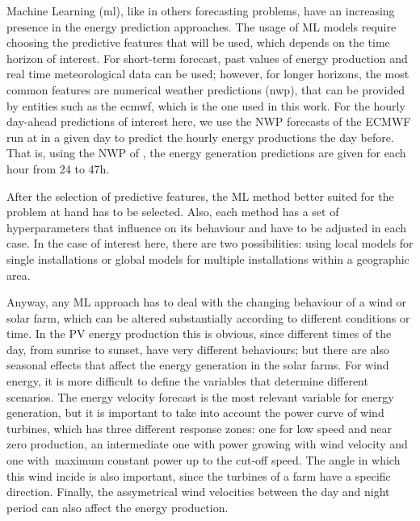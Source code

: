Machine Learning (\acrshort{ml}), like in others forecasting problems, have an increasing presence in the energy prediction approaches. 
The usage of ML models require choosing the predictive features that will be used, which depends on the time horizon of interest. 
For short-term forecast, past values of energy production and real time meteorological data can be used; however, for longer horizons, the most common features are numerical weather predictions (\acrshort{nwp}), that can be provided by entities such as the \acrlong{ecmwf}, which is the one used in this work.
For the hourly day-ahead predictions of interest here, we use the NWP forecasts of the ECMWF run at  in a given day to predict the hourly energy productions the day before. That is, using the NWP of , the energy generation predictions are given for each hour from {24} to {47}h.

After the selection of predictive features, the ML method better suited for the problem at hand has to be selected. Also, each method has a set of hyperparameters that influence on its behaviour and have to be adjusted in each case.
In the case of interest here, there are two possibilities: using local models for single installations or global models for multiple installations within a geographic area.


Anyway, any ML approach has to deal with the changing behaviour of a wind or solar farm, which can be altered substantially according to different conditions or time.
In the PV energy production this is obvious, since different times of the day, from sunrise to sunset, have very different behaviours; but there are also seasonal effects that affect the energy generation in the solar farms.
For wind energy, it is more difficult to define the variables that determine different scenarios. 
The energy velocity forecast is the most relevant variable for energy generation, but it is important to take into account the power curve of wind turbines, which has three different response zones: one for low speed and near zero production, an intermediate one with power growing with wind velocity and one with~maximum constant power up to the cut-off speed.
The angle in which this wind incide is also important, since the turbines of a farm have a specific direction. 
Finally, the assymetrical wind velocities between the day and night period can also affect the energy production.

